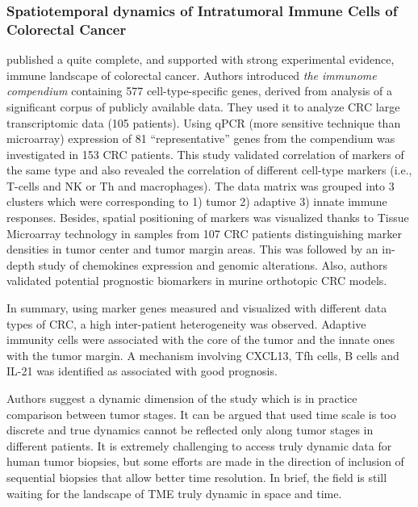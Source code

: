 \documentclass[12pt,]{book}
\theoremstyle{definition}
\theoremstyle{definition}
\theoremstyle{definition}
\theoremstyle{remark}
\begin{document}
\hypertarget{spatiotemporal-dynamics-of-intratumoral-immune-cells-of-colorectal-cancer}{%
\subsubsection{Spatiotemporal dynamics of Intratumoral Immune Cells of
Colorectal
Cancer}\label{spatiotemporal-dynamics-of-intratumoral-immune-cells-of-colorectal-cancer}}

\citet{Bindea2013} published a quite complete, and supported with strong
experimental evidence, immune landscape of colorectal cancer. Authors
introduced \emph{the immunome compendium} containing 577
cell-type-specific genes, derived from analysis of a significant corpus
of publicly available data. They used it to analyze CRC large
transcriptomic data (105 patients). Using qPCR (more sensitive technique
than microarray) expression of 81 ``representative'' genes from the
compendium was investigated in 153 CRC patients. This study validated
correlation of markers of the same type and also revealed the
correlation of different cell-type markers (i.e., T-cells and NK or Th
and macrophages). The data matrix was grouped into 3 clusters which were
corresponding to 1) tumor 2) adaptive 3) innate immune responses.
Besides, spatial positioning of markers was visualized thanks to Tissue
Microarray technology in samples from 107 CRC patients distinguishing
marker densities in tumor center and tumor margin areas. This was
followed by an in-depth study of chemokines expression and genomic
alterations. Also, authors validated potential prognostic biomarkers in
murine orthotopic CRC models.

In summary, using marker genes measured and visualized with different
data types of CRC, a high inter-patient heterogeneity was observed.
Adaptive immunity cells were associated with the core of the tumor and
the innate ones with the tumor margin. A mechanism involving CXCL13, Tfh
cells, B cells and IL-21 was identified as associated with good
prognosis.

Authors suggest a dynamic dimension of the study which is in practice
comparison between tumor stages. It can be argued that used time scale
is too discrete and true dynamics cannot be reflected only along tumor
stages in different patients. It is extremely challenging to access
truly dynamic data for human tumor biopsies, but some efforts are made
in the direction of inclusion of sequential biopsies \citep{Knebel2017}
that allow better time resolution. In brief, the field is still waiting
for the landscape of TME truly dynamic in space and time.
\end{document}

